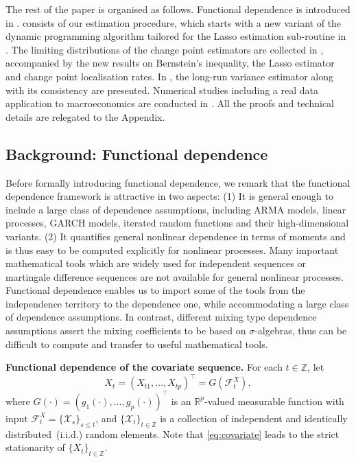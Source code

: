 \documentclass[11pt]{article}
\theoremstyle{plain}
\theoremstyle{definition}
\begin{document}
The rest of the paper is organised as follows. Functional dependence is introduced in .   consists of our estimation procedure, which starts with a new variant of the dynamic programming algorithm tailored for the Lasso estimation sub-routine in .  The limiting distributions of the change point estimators are collected in , accompanied by the new results on Bernstein's inequality, the Lasso estimator and change point localisation rates. In , the long-run variance estimator along with its consistency are presented. Numerical studies including a real data application to macroeconomics are conducted in . All the proofs and technical details are relegated to the Appendix. 

\subsection{Background: Functional dependence}\label{sec:background}

Before formally introducing functional dependence, we remark that the functional dependence framework is attractive in two aspects: (1) It is general enough to include a large class of dependence assumptions, including ARMA models, linear processes, GARCH models, iterated random functions \citep{wu2005nonlinear,wu2011asymptotic} and their high-dimensional variants.  (2) It quantifies general nonlinear dependence in terms of moments and is thus easy to be computed explicitly for nonlinear processes.  Many important mathematical tools which are widely used for independent sequences or martingale difference sequences are not available for general nonlinear processes. Functional dependence enables us to import some of the tools from the independence territory to the dependence one, while accommodating a large class of dependence assumptions. In contrast, different mixing type dependence assumptions assert the mixing coefficients to be based on $\sigma$-algebras, thus can be difficult to compute and transfer to useful mathematical tools.  

\medskip
\noindent \textbf{Functional dependence of the covariate sequence.}  For each $t \in \mathbb{Z}$, let
\begin{equation}\label{eq:covariate}
    X_t = (X_{t1}, \dots, X_{tp})^{\top} = G(\mathcal{F}_t^X),  
\end{equation} 
where $G(\cdot) = (g_1(\cdot), \dots, g_p(\cdot))^{\top}$ is an $\mathbb{R}^p$-valued measurable function with input $\mathcal F_t^X  = \{\mathcal{X}_s\}_{s \leq t}$, and $\{\mathcal{X}_t\}_{t \in \mathbb{Z}}$ is a collection of independent and identically distributed~(i.i.d.) random elements.  Note that \eqref{eq:covariate} leads to the strict stationarity of $\{X_t\}_{t \in \mathbb{Z}}$.
\end{document}
